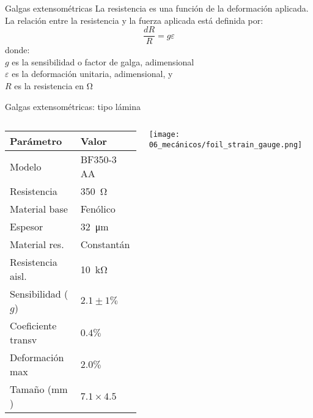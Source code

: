 \documentclass[aspectratio=169]{beamer}
\begin{document}
            

\begin{frame}[t]{Galgas extensométricas}
    La resistencia es una función de la deformación aplicada.
    La relación entre la resistencia y la fuerza aplicada está definida por:
    \begin{equation*}
        \dfrac{dR}{R} = g \varepsilon
    \end{equation*}
    donde:\\
    $g$ es la sensibilidad o factor de galga, adimensional\\
    $\varepsilon$ es la deformación unitaria, adimensional, y\\
    $R$ es la resistencia en $\si{\ohm}$
\end{frame}

\begin{frame}{Galgas extensométricas: tipo lámina}
    \begin{columns}[c, onlytextwidth]
        \begin{column}{0.55\textwidth}
            \begin{tabular}{ll}
            \toprule
            \textbf{Parámetro} & \textbf{Valor} \\
            \midrule
            Modelo & BF350-3 AA \\
            Resistencia & \SI{350}{\ohm} \\
            Material base & Fenólico \\
            Espesor & \SI{32}{\micro\meter} \\
            Material res. & Constantán \\
            Resistencia aisl. & \SI{10}{\kilo\ohm}\\
            Sensibilidad ($g$) & $2.1 \pm 1\%$\\
            Coeficiente transv & $0.4\%$ \\
            Deformación max & $2.0\%$ \\
            Tamaño ($\si{\milli\meter}$) & $7.1 \times 4.5$ \\
            \bottomrule
            \end{tabular}
        \end{column}
        \begin{column}{0.45\textwidth}
        \centering
        \texttt{[image: 06\_mecánicos/foil\_strain\_gauge.png]}
        \end{column}
    \end{columns}
\end{frame}
\end{document}
